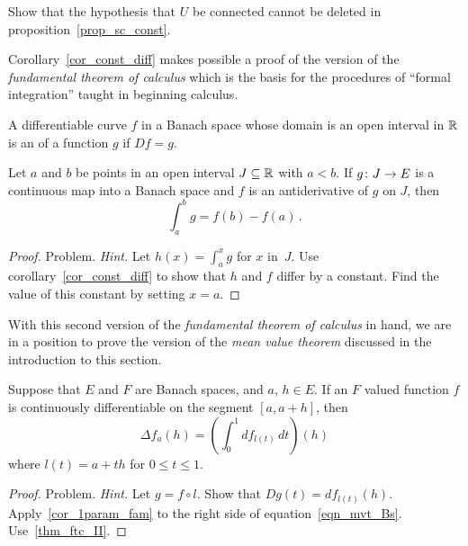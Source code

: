 \begin{prob}  Show that the hypothesis that $U$ be connected cannot be deleted in
proposition~\ref{prop_sc_const}.
\end{prob}

Corollary~\ref{cor_const_diff} makes possible a proof of the version of the \emph{fundamental
theorem of calculus} which is the basis for the procedures of ``formal integration'' taught in
beginning calculus.

\begin{defn}  A differentiable curve $f$ in a Banach space whose domain is an open interval in
$\mathbb{R}$ is an
 of a function $g$ if $Df = g$.
\end{defn}

\begin{thm}
\label{thm_ftc_II}  Let $a$ and $b$ be points in an open interval $J  \subseteq \mathbb{R}$ with $a <
b$.  If $g\colon J \rightarrow E$ is a continuous map into a Banach space and $f$ is an
antiderivative of $g$ on $J$, then
  \[ \int_a^b g = f(b) - f(a)\,. \]
\end{thm}

\begin{proof} Problem.   \emph{Hint.}  Let $h(x) = \int_a^xg$ for $x$ in~$J$.  Use
corollary~\ref{cor_const_diff} to show that $h$ and $f$ differ by a constant.  Find the value
of this constant by setting $x = a$.   \ns
\end{proof}

With this second version of the \emph{fundamental theorem of calculus} in hand, we are in a
position to prove the version of the \emph{mean value theorem} discussed in the introduction
to this section.

\begin{prop}\label{prop_mvt_Bs}  Suppose that $E$ and $F$ are Banach spaces, and $a$, $h \in E$.
If an $F$ valued function $f$ is continuously differentiable on the segment $[a,a + h]$, then
 \begin{equation}\label{eqn_mvt_Bs}
    \Delta f_a(h) = \left( \int_0^1 df_{l(t)}\,dt\right)(h)
 \end{equation}
where $l(t) = a + th$  for $0 \leq t \leq 1$.
\end{prop}

\begin{proof} Problem.   \emph{Hint.}  Let $g = f\circ l$.  Show that $Dg(t)=df_{l(t)}(h)$.
Apply~\ref{cor_1param_fam} to the right side of equation~\eqref{eqn_mvt_Bs}.
Use~\ref{thm_ftc_II}.  \ns
\end{proof}


